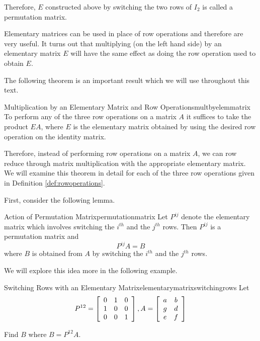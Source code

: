 Therefore, $E$ constructed above by switching the two rows of $I_2$ is called a permutation matrix. 

Elementary matrices can be used in place of row operations and therefore are very useful. It turns
out that multiplying (on the left hand side) by an elementary matrix $E$ will have the
same effect as doing the row operation used to obtain $E$.

The following theorem is an important result which we will use throughout this text. 

\begin{theorem}{Multiplication by an Elementary Matrix and Row Operations}{multbyelemmatrix}
To perform any of the three row operations on a matrix $A$
it suffices to take the product $EA$, where $E$ is the elementary matrix obtained by 
using the desired row operation on the identity matrix.
\end{theorem}

Therefore, instead of performing row operations on a matrix $A$, we
can row reduce through matrix multiplication with the appropriate
elementary matrix. We will examine this theorem in detail for each of
the three row operations given in Definition \ref{def:rowoperations}.

First, consider the following lemma.

\begin{lemma}{Action of Permutation Matrix}{permutationmatrix}
Let $P^{ij}$ denote the elementary matrix which involves
switching the $i^{th}$ and the $j^{th}$ rows. Then $P^{ij}$ is a permutation matrix and 
\begin{equation*}
P^{ij}A=B
\end{equation*}
where $B$ is obtained from $A$ by switching the $i^{th}$ and the $j^{th}$
rows.
\end{lemma}

We will explore this idea more in the following example.

\begin{example}{Switching Rows with an Elementary Matrix}{elementarymatrixswitchingrows}
Let
\begin{equation*}
P^{12} = \left[
\begin{array}{rrr}
0 & 1 & 0 \\
1 & 0 & 0 \\
0 & 0 & 1
\end{array}
\right], A = \left[
\begin{array}{cc}
a & b \\
g & d \\
e & f
\end{array}
\right] 
\end{equation*}

Find $B$ where $B = P^{12}A$.
\end{example}

